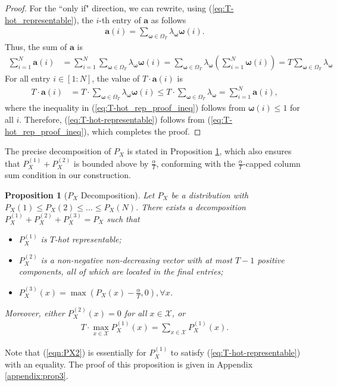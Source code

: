 \documentclass[11pt,letterpaper]{article}
\newtheorem{prop}{\textbf{Proposition}}
\newcommand{\cX}{\mathcal{X}}
\begin{document}
\begin{proof}
    For the ``only if"    direction, we can rewrite, using (\ref{eq:T-hot_representable}), the $i$-th entry of $\boldsymbol{a}$ as follows
    \begin{align}
        \boldsymbol{a}(i) = \sum_{\boldsymbol{\omega} \in \Omega_T} \lambda_{\boldsymbol{\omega}}\boldsymbol{\omega}(i).
    \end{align}
    Thus, the sum of $\boldsymbol{a}$ is 
    \begin{align}
        \sum_{i=1}^N \boldsymbol{a}(i) & = \sum_{i=1}^N \sum_{\boldsymbol{\omega} \in \Omega_T} \lambda_{\boldsymbol{\omega}}\boldsymbol{\omega}(i)=  \sum_{\boldsymbol{\omega} \in \Omega_T} \lambda_{\boldsymbol{\omega}} \left( \sum_{i=1}^N \boldsymbol{\omega}(i) \right) = T \sum_{\boldsymbol{\omega} \in \Omega_T} \lambda_{\boldsymbol{\omega}}
    \end{align}
    For all entry $i \in [1:N]$, the value of $T\cdot \boldsymbol{a}(i)$ is 
    \begin{align}
        T\cdot \boldsymbol{a}(i) & = T\cdot \sum_{\boldsymbol{\omega} \in \Omega_T} \lambda_{\boldsymbol{\omega}}\boldsymbol{\omega}(i) \leq T\cdot \sum_{\boldsymbol{\omega} \in \Omega_T} \lambda_{\boldsymbol{\omega}} = \sum_{i=1}^N \boldsymbol{a}(i), \label{eq:T-hot_rep_proof_ineq}
    \end{align}
    where the inequality in (\ref{eq:T-hot_rep_proof_ineq}) follows from $\boldsymbol{\omega}(i)\leq 1$ for all $i$. Therefore, (\ref{eq:T-hot-representable}) follows from (\ref{eq:T-hot_rep_proof_ineq}), which completes the proof. 
\end{proof}

The precise decomposition of $P_X$ is stated in Proposition \ref{prop:split_px}, which also ensures that $P_X^{(1)} + P_X^{(2)}$ is bounded above by $\tfrac{\alpha}{T}$, conforming with the $\tfrac{\alpha}{T}$-capped column sum condition in our construction.

\begin{prop}[$P_X$ Decomposition] \label{prop:split_px}
    Let $P_X$ be a distribution with $P_X(1) \leq P_X(2) \leq \dots \leq P_X(N)$. There exists a decomposition $P_X^{(1)}+P_X^{(2)}+P_X^{(3)} = P_X$ such that 
    \begin{itemize}
        \item[1.] $P_X^{(1)}$ is $T$-hot representable;
        \item[2.] $P_X^{(2)}$ is a non-negative non-decreasing vector with at most $T-1$  positive components, all of which are located in the final entries;
        \item[3.] $P_X^{(3)}(x) = \max(P_X(x) -\tfrac{\alpha}{T}, 0), \forall x$.
    \end{itemize}
    Moreover, either $P^{(2)}_X(x)=0$ for all $x\in\cX$, or 
    \begin{align}
    T\cdot\max_{x\in \cX}P_X^{(1)}(x)=\sum_{x\in\cX}P_X^{(1)}(x).\label{eqn:PX2}
    \end{align}
\end{prop}
Note that (\ref{eqn:PX2}) is essentially for $P_X^{(1)}$ to satisfy (\ref{eq:T-hot-representable}) with an equality. The proof of this proposition is given in Appendix \ref{appendix:prop3}.
\end{document}
